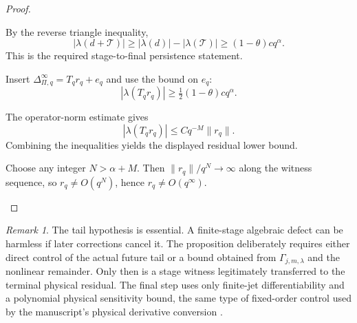 \documentclass[12pt]{article}
\theoremstyle{plain}
\theoremstyle{definition}
\theoremstyle{remark}
\newtheorem{remark}[theorem]{Remark}
\newcommand{\Obs}{\Pi}
\newcommand{\Tail}{\mathscr T}
\begin{document}
\begin{proof}
\begin{prooflines}
\item By the reverse triangle inequality,
\[
|\lambda(d+\Tail)|\ge|\lambda(d)|-|\lambda(\Tail)|
\ge(1-\theta)cq^\alpha.
\]
This is the required stage-to-final persistence statement.
\item Insert \(\Delta^{\infty}_{\Obs,q}=T_qr_q+e_q\) and use the bound on \(e_q\):
\[
|\lambda(T_qr_q)|
\ge\tfrac12(1-\theta)cq^\alpha.
\]
\item The operator-norm estimate gives
\[
|\lambda(T_qr_q)|\le Cq^{-M}\|r_q\|.
\]
Combining the inequalities yields the displayed residual lower bound.
\item Choose any integer \(N>\alpha+M\). Then \(\|r_q\|/q^N\to\infty\) along the witness sequence, so \(r_q\neq O(q^N)\), hence \(r_q\neq O(q^\infty)\).
\end{prooflines}
\end{proof}

\begin{remark}
The tail hypothesis is essential. A finite-stage algebraic defect can be harmless if later corrections cancel it. The proposition deliberately requires either direct control of the actual future tail or a bound obtained from \(\Gamma_{j,m,\lambda}\) and the nonlinear remainder. Only then is a stage witness legitimately transferred to the terminal physical residual. The final step uses only finite-jet differentiability and a polynomial physical sensitivity bound, the same type of fixed-order control used by the manuscript's physical derivative conversion \cite{RobinsonRodrigoSadowski2016,OpenAI2026}.
\end{remark}
\end{document}
